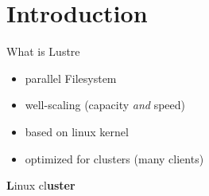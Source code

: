 \section{Introduction}

\begin{frame}{What is Lustre}
    \begin{itemize}
        \item parallel Filesystem
        \item well-scaling (capacity \emph{and} speed)
        \item based on linux kernel
        \item optimized for clusters (many clients)
    \end{itemize}

    \pause
    \vspace{1cm}
    \center \LARGE \textbf{L}inux cl\textbf{uster}
\end{frame}


